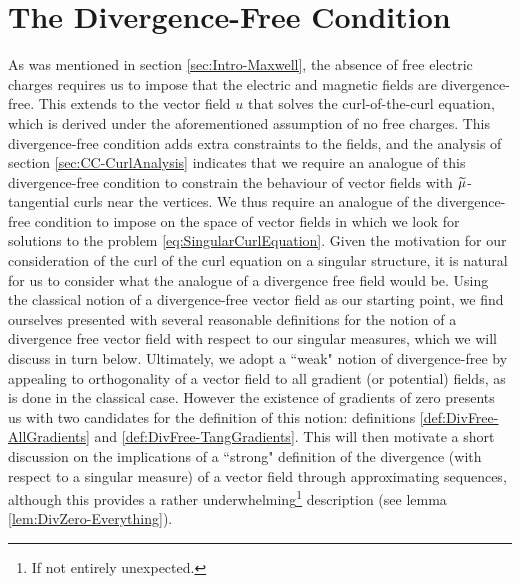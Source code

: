 \section{The Divergence-Free Condition} \label{sec:DivFreeCondition}
As was mentioned in section \ref{sec:Intro-Maxwell}, the absence of free electric charges requires us to impose that the electric and magnetic fields are divergence-free.
This extends to the vector field $u$ that solves the curl-of-the-curl equation, which is derived under the aforementioned assumption of no free charges.
This divergence-free condition adds extra constraints to the fields, and the analysis of section \ref{sec:CC-CurlAnalysis} indicates that we require an analogue of this divergence-free condition to constrain the behaviour of vector fields with $\widetilde{\mu}$-tangential curls near the vertices.
We thus require an analogue of the divergence-free condition to impose on the space of vector fields in which we look for solutions to the problem \eqref{eq:SingularCurlEquation}.
Given the motivation for our consideration of the curl of the curl equation on a singular structure, it is natural for us to consider what the analogue of a divergence free field would be.
Using the classical notion of a divergence-free vector field as our starting point, we find ourselves presented with several reasonable definitions for the notion of a divergence free vector field with respect to our singular measures, which we will discuss in turn below.
Ultimately, we adopt a ``weak" notion of divergence-free by appealing to orthogonality of a vector field to all gradient (or potential) fields, as is done in the classical case.
However the existence of gradients of zero presents us with two candidates for the definition of this notion: definitions \ref{def:DivFree-AllGradients} and \ref{def:DivFree-TangGradients}.
This will then motivate a short discussion on the implications of a ``strong" definition of the divergence (with respect to a singular measure) of a vector field through approximating sequences, although this provides a rather underwhelming\footnote{If not entirely unexpected.} description (see lemma \ref{lem:DivZero-Everything}).

